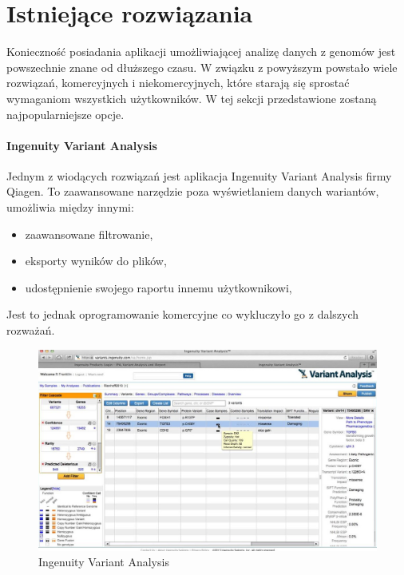 \documentclass[a4paper,12pt,twoside]{article}
\begin{document}
\newpage
\section{Istniejące rozwiązania}  

Konieczność posiadania aplikacji umożliwiającej analizę danych z genomów 
jest powszechnie znane od dłuższego czasu. W związku z powyższym 
powstało wiele rozwiązań,
komercyjnych i niekomercyjnych, które starają się sprostać wymaganiom wszystkich użytkowników. W tej sekcji przedstawione zostaną najpopularniejsze opcje.

\paragraph{Ingenuity Variant Analysis} Jednym z wiodących rozwiązań jest aplikacja Ingenuity Variant Analysis \cite{ingenuity} firmy Qiagen. To zaawansowane narzędzie
poza wyświetlaniem danych wariantów, umożliwia między innymi:

\begin{itemize}
\item zaawansowane filtrowanie,
\item eksporty wyników do plików,
\item udostępnienie swojego raportu innemu użytkownikowi,
\end{itemize} 
  
Jest to jednak oprogramowanie komercyjne co wykluczyło go z dalszych 
rozważań.

\begin{figure}[h]
\includegraphics[width=\linewidth]{obrazy/exac/ingenuity.jpg}
  \caption{Ingenuity Variant Analysis \cite{ingenuity}}
  \label{fig:ingenuitypic}
\end{figure}
\newpage
\end{document}
